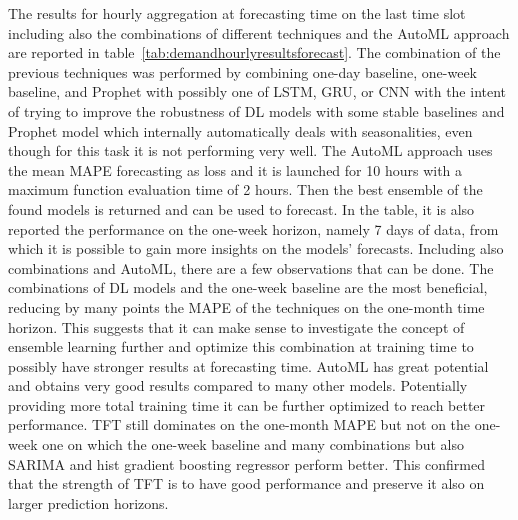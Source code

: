The results for hourly aggregation at forecasting time on the last time slot including also the combinations of different techniques and the AutoML approach are reported in table~\ref{tab:demandhourlyresultsforecast}.
The combination of the previous techniques was performed by combining one-day baseline, one-week baseline, and Prophet with possibly one of LSTM, GRU, or CNN with the intent of trying to improve the robustness of DL models with some stable baselines and Prophet model which internally automatically deals with seasonalities, even though for this task it is not performing very well.
The AutoML approach uses the mean MAPE forecasting as loss and it is launched for 10 hours with a maximum function evaluation time of 2 hours.
Then the best ensemble of the found models is returned and can be used to forecast.
In the table, it is also reported the performance on the one-week horizon, namely 7 days of data, from which it is possible to gain more insights on the models' forecasts.
Including also combinations and AutoML, there are a few observations that can be done.
The combinations of DL models and the one-week baseline are the most beneficial, reducing by many points the MAPE of the techniques on the one-month time horizon.
This suggests that it can make sense to investigate the concept of ensemble learning further and optimize this combination at training time to possibly have stronger results at forecasting time.
AutoML has great potential and obtains very good results compared to many other models.
Potentially providing more total training time it can be further optimized to reach better performance.
TFT still dominates on the one-month MAPE but not on the one-week one on which the one-week baseline and many combinations but also SARIMA and hist gradient boosting regressor perform better.
This confirmed that the strength of TFT is to have good performance and preserve it also on larger prediction horizons.

